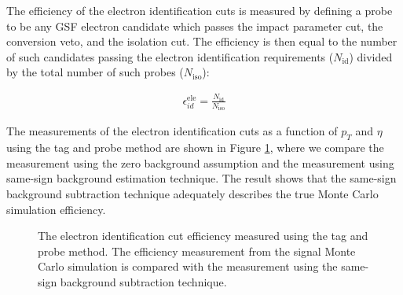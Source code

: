 \documentclass{cmspaper}
\begin{document}
The efficiency of the electron identification cuts is measured by defining a probe to be any GSF electron candidate which passes the impact parameter cut, the conversion veto, and the isolation cut. The efficiency is then equal to the number of such candidates passing the electron identification requirements ($N_{\mathrm{id}}$) divided by the total number of such probes ($N_{\mathrm{iso}}$):

\begin{eqnarray}
  \label{eqn:electronIDEfficiency}  
  \epsilon_{id}^{\mathrm{ele}} = \frac{N_{\mathrm{id}}}{N_{\mathrm{iso}}}
\end{eqnarray}

The measurements of the electron identification cuts as a function of $p_{T}$ and $\eta$ using the tag and probe method are shown in Figure \ref{eleIDCutEfficiency_TagAndProbe}, where we compare the measurement using the zero background assumption and the measurement using same-sign background estimation technique. The result shows that the same-sign background subtraction technique adequately describes the true Monte Carlo simulation efficiency.

\begin{figure}[htb]
  \begin{center}
    \caption{The electron identification cut efficiency measured using the tag and probe method. The efficiency measurement from the signal Monte Carlo simulation is compared with the measurement using the same-sign background subtraction technique.}
    \label{eleIDCutEfficiency_TagAndProbe}
  \end{center}
\end{figure}
\end{document}
